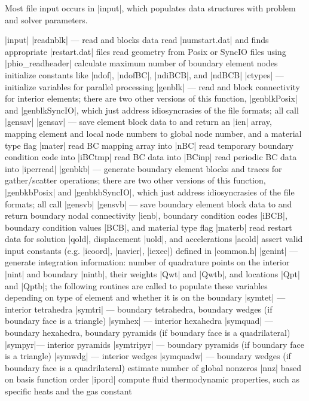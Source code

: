 \documentclass[11pt]{article}
\begin{document}
Most file input occurs in |input|, which populates data structures with problem and solver parameters.
\begin{outline}[deep]
\1 |input|
	\2 |readnblk| --- read and blocks data
		\3 read |numstart.dat| and finds appropriate |restart.dat| files
		\3 read geometry from Posix or SyncIO files using |phio_readheader|
		\3 calculate maximum number of boundary element nodes
		\3 initialize constants like |ndof|, |ndofBC|, |ndiBCB|, and |ndBCB|
		\3 |ctypes| --- initialize variables for parallel processing
		\3 |genblk| --- read and block connectivity for interior elements; there are two other versions of this function, |genblkPosix| and |genblkSyncIO|, which just address idiosyncrasies of the file formats; all call |gensav|
			\4 |gensav| --- save element block data to and return an |ien| array, mapping element and local node numbers to global node number, and a material type flag |mater|
		\3 read BC mapping array into |nBC|
		\3 read temporary boundary condition code into |iBCtmp|
		\3 read BC data into |BCinp|
		\3 read periodic BC data into |iperread|
		\3 |genbkb| --- generate boundary element blocks and traces for gather/scatter operations; there are two other versions of this function, |genbkbPosix| and |genbkbSyncIO|, which just address idiosyncrasies of the file formats; all call |gensvb|
			\4 |gensvb| --- save boundary element block data to and return boundary nodal connectivity |ienb|, boundary condition codes |iBCB|, boundary condition values |BCB|, and material type flag |materb|
		\3 read restart data for solution |qold|, displacement |uold|, and accelerations |acold|
	\2 assert valid input constants (e.g. |icoord|, |navier|, |iexec|) defined in |common.h|
	\2 |genint| --- generate integration information: number of quadrature points on the interior |nint| and boundary |nintb|, their weights |Qwt| and |Qwtb|, and locations |Qpt| and |Qptb|; the following routines are called to populate these variables depending on type of element and whether it is on the boundary
		\3 |symtet| --- interior tetrahedra
		\3 |symtri| --- boundary tetrahedra, boundary wedges (if boundary face is a triangle)
		\3 |symhex| --- interior hexahedra
		\3 |symquad| --- boundary hexahedra, boundary pyramids (if boundary face is a quadrilateral)
		\3 |sympyr|--- interior pyramids
		\3 |symtripyr| --- boundary pyramids (if boundary face is a triangle)
		\3 |symwdg| --- interior wedges
		\3 |symquadw| --- boundary wedges (if boundary face is a quadrilateral)
	\2 estimate number of global nonzeros |nnz| based on basis function order |ipord|
	\2 compute fluid thermodynamic properties, such as specific heats and the gas constant
\end{outline}
\end{document}

